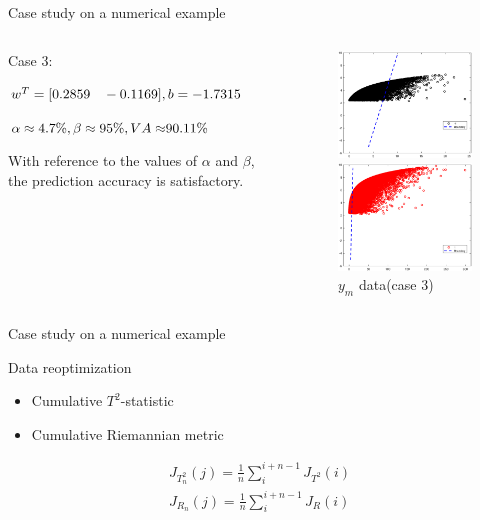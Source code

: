 \documentclass[10pt]{beamer}
\begin{document}
\begin{frame}{Case study on a numerical example}
 \begin{columns}
             \begin{column}{0.5\textwidth}
   Case 3: \par
     $\small{w^T = [0.2859 \quad -0.1169]
 , b =-1.7315 } $\par $\small{\alpha  \approx 4.7\%,\beta  \approx 95 \% ,VA \approx}90.11 \% $ \par 
 With reference to the values of $\alpha$ and $\beta$, the prediction accuracy is satisfactory.
           \end{column}
        \begin{column}{0.4\textwidth}  %
   \begin{figure}
        \centering
        \includegraphics[width=4cm]{fig/EAandhyper.eps}
        \caption{$y_n$ data(case 3)}
        \includegraphics[width=4cm]{fig/EMandhyper.eps}
        \caption{ $y_{m}$ data(case 3)}
        \end{figure}
        \end{column}
    \end{columns}    
\end{frame}
\begin{frame}{Case study on a numerical example}
      \begin{exampleblock}{Data reoptimization}
	\begin{itemize}
    \item Cumulative  $T^2$-statistic
    \item Cumulative  Riemannian metric
    \end{itemize}
    \end{exampleblock}
    \begin{small}
    \begin{equation}\nonumber
       \begin{aligned}
       J_{T_n^2}(j) = \frac{1}{n}\sum_{i}^{i+n-1}J_{T^2}(i) \\
       J_{R_n}(j) = \frac{1}{n}\sum_{i}^{i+n-1}J_R(i)
       \end{aligned}
    \end{equation}
    \end{small}
\end{frame}
\end{document}
